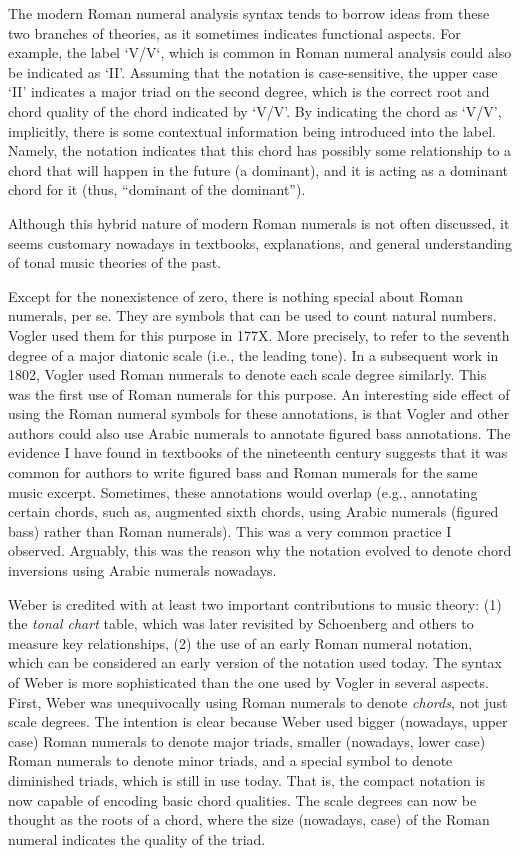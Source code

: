 The modern Roman numeral analysis syntax tends to borrow
ideas from these two branches of theories, as it sometimes
indicates functional aspects. For example, the label
`V/V`, which is common in Roman numeral analysis could
also be indicated as `II'. Assuming that the notation is
case-sensitive, the upper case `II' indicates a major
triad on the second degree, which is the correct root and
chord quality of the chord indicated by `V/V'. By
indicating the chord as `V/V', implicitly, there is some
contextual information being introduced into the label.
Namely, the notation indicates that this chord has
possibly some relationship to a chord that will happen in
the future (a dominant), and it is acting as a dominant
chord for it (thus, ``dominant of the dominant'').

Although this hybrid nature of modern Roman numerals is
not often discussed, it seems customary nowadays in
textbooks, explanations, and general understanding of
tonal music theories of the past.


 Except for
the nonexistence of zero, there is nothing special about
Roman numerals, per se. They are symbols that can be used
to count natural numbers. Vogler used them for this
purpose in 177X. More precisely, to refer to the seventh
degree of a major diatonic scale (i.e., the leading tone).
In a subsequent work in 1802, Vogler used Roman numerals
to denote each scale degree similarly. This was the first
use of Roman numerals for this purpose. An interesting
side effect of using the Roman numeral symbols for these
annotations, is that Vogler and other authors could also
use Arabic numerals to annotate figured bass annotations.
The evidence I have found in textbooks of the nineteenth
century suggests that it was common for authors to write
figured bass and Roman numerals for the same music
excerpt. Sometimes, these annotations would overlap (e.g.,
annotating certain chords, such as, augmented sixth
chords, using Arabic numerals (figured bass) rather than
Roman numerals). This was a very common practice I
observed. Arguably, this was the reason why the notation
evolved to denote chord inversions using Arabic numerals
nowadays.

 Weber is
credited with at least two important contributions to
music theory: (1) the \emph{tonal chart} table, which was
later revisited by Schoenberg and others to measure key
relationships, (2) the use of an early Roman numeral
notation, which can be considered an early version of the
notation used today. The syntax of Weber is more
sophisticated than the one used by Vogler in several
aspects. First, Weber was unequivocally using Roman
numerals to denote \emph{chords}, not just scale degrees.
The intention is clear because Weber used bigger
(nowadays, upper case) Roman numerals to denote major
triads, smaller (nowadays, lower case) Roman numerals to
denote minor triads, and a special symbol to denote
diminished triads, which is still in use today. That is,
the compact notation is now capable of encoding basic
chord qualities. The scale degrees can now be thought as
the roots of a chord, where the size (nowadays, case) of
the Roman numeral indicates the quality of the triad.

